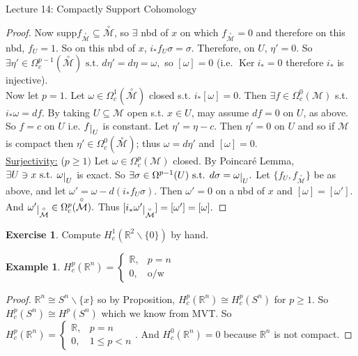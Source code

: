 \documentclass[10pt]{article}
\theoremstyle{plain}
\theoremstyle{definition}
\newtheorem{exmp}[thm]{Example} %
\newtheorem{exercise}[thm]{Exercise}
\newcommand{\st}{\text{ s.t. }}
\newcommand{\Real}{\mathbb{R}}
\newcommand{\man}{\mathcal{M}}
\newcommand{\compactpformman}[1]{\Omega^{#1}_c(\man)}
\newcommand{\deriv}{d}
\newcommand{\df}{df}
\newcommand{\deta}{\deriv\eta}
\def\restrict#1{\raise-.5ex\hbox{\ensuremath|}_{#1}}
\DeclareMathOperator{\Ker}{Ker}
\newcommand{\puncman}{\overset{\circ}{\man}}
\begin{document}
\begin{section}{Lecture 14: Compactly Support Cohomology}
\begin{proof}
Now supp$f_{\puncman}\subseteq \puncman$, so $\exists$ nbd of $x$ on which $f_{\puncman} = 0$ and therefore on this nbd, $f_U = 1.$ So on this nbd of $x$, $i_*f_U \sigma = \sigma$. Therefore, on $U$, $\eta' = 0.$ So $\exists \eta' \in \Omega_c ^{p-1} (\puncman) \st \deta ' = \deta = \omega,$ so $[\omega] = 0$ (i.e. $\Ker i_* = 0$ therefore $i_*$ is injective).\\
Now let $p = 1.$ Let $\omega \in \Omega_c^1(\puncman) $ closed s.t. $i_* [ \omega ] = 0.$ Then $\exists f \in \Omega_c^0(\man)$ s.t. $i_*\omega = \df$. By taking $U \subseteq \man $ open s.t. $x\in U$, may assume $\df = 0$ on $U$, as above. So $f = c$ on $U$ i.e. $f\restrict{U}$ is constant. Let $\eta' = \eta -c$. Then $\eta' = 0$ on $U$ and so if $\man$ is compact then $\eta' \in \Omega_c^0(\puncman)$; thus $\omega = \deta' $ and $[\omega] = 0$.\\
\underline{Surjectivity:} ($p\geq 1)$ Let $\omega \in \compactpformman{p}$ closed. By Poincar\'e Lemma, $\exists U \ni x \st \omega \restrict{U} $ is exact. So $\exists \sigma \in \Omega^{p-1}(U) \st \deriv \sigma = \omega \restrict{U}.$ Let $\{f_U, f_{\puncman}\}$ be as above, and let $\omega' = \omega - \deriv(i_* f_U \sigma)$. Then $\omega ' = 0 $ on a nbd of $x$ and $[\omega ] = [\omega ' ].$ And $\omega ' \restrict{\puncman} \in \Omega_c^p(\puncman).$ Thus $[i_*\omega' \restrict{\puncman}] = [\omega'] = [\omega].$
\end{proof}
\begin{exercise}
Compute $H^1_c(\Real^2 \backslash \{0\})$ by hand.
\end{exercise}
\begin{exmp}
$H_c^p(\Real^n) = \begin{cases} \Real, & p = n \\ 0 ,& \text{o/w} \end{cases}$
\end{exmp}
\begin{proof}
$\Real^n \cong S^n \backslash \{x\}$ so by Proposition, $H^p_c(\Real^n) \cong H^p_c(S^n)$ for $p\geq 1$. So $H^p_c(S^n) \cong H^p(S^n)$ which we know from MVT. So $H^p_c(\Real^n) = \begin{cases} \Real, & p = n \\ 0 ,& 1\leq p < n \end{cases}$. And $H^0_c(\Real^n) = 0$ because $\Real^n$ is not compact.
\end{proof}




\end{section}
\end{document}
